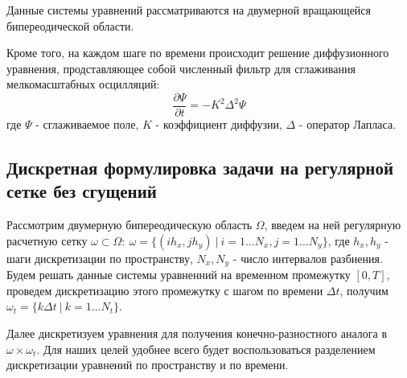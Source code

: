 \documentclass[12pt,a4paper]{article} %
\newcommand{\pd}[0]{\partial} %
\begin{document}
	Данные системы уравнений рассматриваются на двумерной вращающейся бипереодической области. 
	
	Кроме того, на каждом шаге по времени происходит решение диффузионного уравнения, продставляющее собой численный фильтр для сглаживания мелкомасштабных осцилляций:
	$$\frac{\pd \Psi}{\pd t} = -K^2\Delta^2\Psi$$
	где $\Psi$ - сглаживаемое поле, $K$ - коэффициент диффузии, $\Delta$ - оператор Лапласа.
	
\subsection{Дискретная формулировка задачи на регулярной сетке без сгущений}

	Рассмотрим двумерную бипереодическую область $\Omega$, введем на ней регулярную расчетную сетку $\omega \subset \Omega: \ \omega=\{(ih_x, jh_y)\ | \ i=1 \ldots N_x, j=1 \ldots N_y\}$, где $h_x, h_y$ - шаги дискретизации по пространству, $N_x, N_y$ - число интервалов разбиения. Будем решать данные системы уравненний на временном промежутку $[0, T]$, проведем дискретизацию этого промежутку с шагом по времени $\Delta t$, получим $\omega_t = \{k\Delta t \ | \ k=1 \ldots N_t\}$. 
	
	Далее дискретизуем уравнения для получения конечно-разностного аналога в $\omega \times \omega_t$. Для наших целей удобнее всего будет воспользоваться разделением дискретизации уравнений по пространству и по времени.
	
\end{document}
